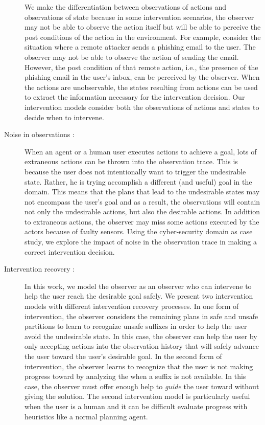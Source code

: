 \begin{description}
We make the differentiation between observations of actions and observations of state because in some intervention scenarios, the observer may not be able to observe the action itself but will be able to perceive the post conditions of the action in the environment. 
For example, consider the situation where a remote attacker sends a phishing email to the user. The observer may not be able to observe the action of sending the email.
However, the post condition of that remote action, i.e., the presence of the phishing email in the user's inbox, can be perceived by the observer.
When the actions are unobservable, the states resulting from actions can be used to extract the information necessary for the intervention decision.
Our intervention models consider both the observations of actions and states to decide when to intervene.
\item [Noise in observations :] When an agent or a human user executes actions to achieve a goal, lots of extraneous actions can be thrown into the observation trace. 
This is because the user does not intentionally want to trigger the undesirable state. Rather, he is trying accomplish a different (and useful) goal in the domain. 
This means that the plans that lead to the undesirable states may not encompass the user's goal and as a result, the observations will contain not only the undesirable actions, but also the desirable actions.
In addition to extraneous actions, the observer may miss some actions executed by the actors because of faulty sensors. 
Using the cyber-security domain as case study, we explore the impact of noise in the observation trace in making a correct intervention decision.
\item [Intervention recovery :] In this work, we model the observer as an observer who can intervene to help the user reach the desirable goal safely. We present two intervention models with different intervention recovery processes.
In one form of intervention, the observer considers the remaining plans in safe and unsafe partitions to learn to recognize unsafe suffixes in order to help the user avoid the undesirable state.
In this case, the observer can help the user by only accepting actions into the observation history that will safely advance the user toward the user's desirable goal.
In the second form of intervention, the observer learns to recognize that the user is not making progress toward \desired by analyzing the \historyDef when a suffix is not available. In this case,  the observer must offer enough help to \textit{guide} the user toward \desired without giving the solution. 
The second intervention model is particularly useful when the user is a human and it can be difficult evaluate progress with heuristics like a normal planning agent.
\end{description}


